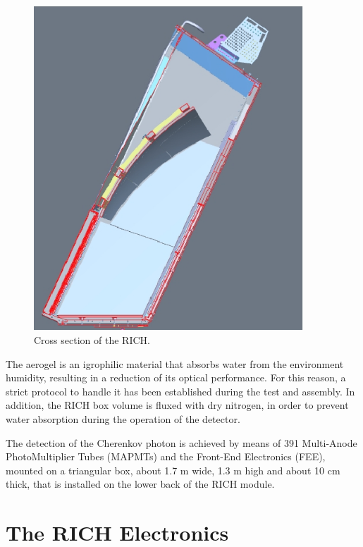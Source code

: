 \documentclass[12pt]{article}
\begin{document}
\begin{figure}[h!]
\center
\includegraphics[width=0.9\textwidth]{pics/Rich_lateral.jpg}
\caption{ \label{fig:RICH_inner} Cross section of the RICH.}
\end{figure}

The aerogel is an igrophilic material that absorbs water from the environment humidity, resulting in a reduction of its optical performance.
For this reason, a strict protocol to handle it has been established during the test and assembly.
In addition, the RICH box volume is fluxed with dry nitrogen, in order to prevent water absorption during the operation of the detector.

The detection of the Cherenkov photon is achieved by means of 391 Multi-Anode PhotoMultiplier Tubes (MAPMTs) and the Front-End Electronics (FEE), mounted on a triangular box, about 1.7 m wide, 1.3 m high and about 10 cm thick, that is installed on the lower back of the RICH module.


{\color{blue}
\section{The RICH Electronics}
}
\end{document}
